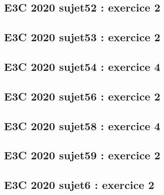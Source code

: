 \documentclass[lang=fr,edition=teacher,layout=sheet]{mxbook}
\begin{document}
\begingroup\endgroup
\par\bigskip
{}\subsection*{E3C 2020 sujet52 : exercice 2}
\begingroup\endgroup
\par\bigskip
{}\subsection*{E3C 2020 sujet53 : exercice 2}
\begingroup\endgroup
\par\bigskip
{}\subsection*{E3C 2020 sujet54 : exercice 4}
\begingroup\endgroup
\par\bigskip
{}\subsection*{E3C 2020 sujet56 : exercice 2}
\begingroup\endgroup
\par\bigskip
{}\subsection*{E3C 2020 sujet58 : exercice 4}
\begingroup\endgroup
\par\bigskip
{}\subsection*{E3C 2020 sujet59 : exercice 2}
\begingroup\endgroup
\par\bigskip
{}\subsection*{E3C 2020 sujet6 : exercice 2}
\begingroup\endgroup
\end{document}
